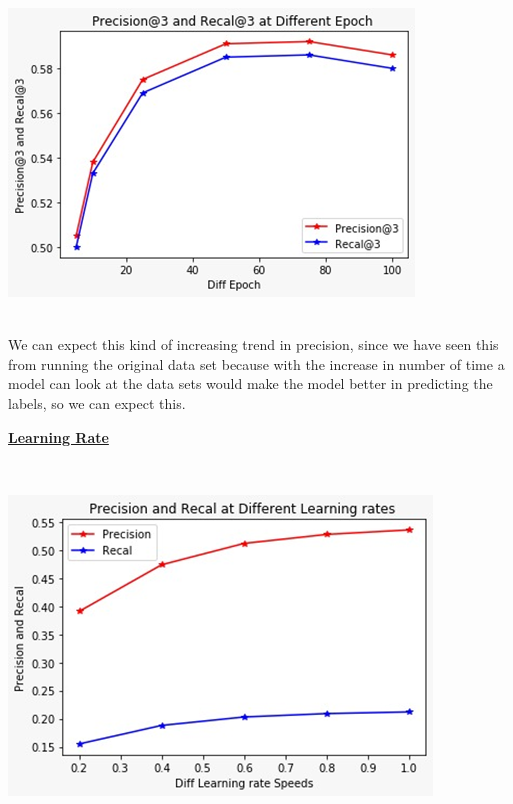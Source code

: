 \documentclass[a4paper,1pt]{article}
\begin{document}
\begin{center}
	\begin{minipage}{\linewidth}
		\centering
		\includegraphics[width=0.5\linewidth]{"Precision and Recall at position 28"}
		
	\end{minipage}
\end{center}

\\
\noindent We can expect this kind of increasing trend in precision, since we have seen this from running the original data set because with the increase in number of time a model can look at the data sets would make the model better in predicting the labels, so we can expect this.


\begin{center}
	\textbf{\underline{Learning Rate}}
\end{center}

\\

\begin{center}
	\begin{minipage}{\linewidth}
		\centering
		\includegraphics[width=0.5\linewidth]{"Precision and Recall at position 29"}
		
	\end{minipage}
\end{center}
\end{document}
